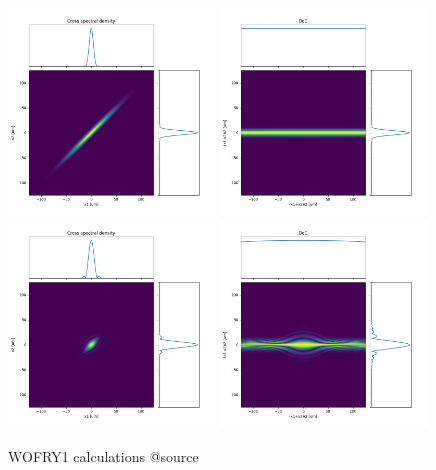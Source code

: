 \documentclass{iucr}              %
\begin{document}
\begin{figure}
    \label{fig:CSD_SRW_source}
    \includegraphics[width=0.49\textwidth]{figures/WOFRY1_CSD_source_h.png}
    \includegraphics[width=0.49\textwidth]{figures/WOFRY1_CSD2_source_h.png}
    \includegraphics[width=0.49\textwidth]{figures/WOFRY1_CSD_source_v.png}
    \includegraphics[width=0.49\textwidth]{figures/WOFRY1_CSD2_source_v.png}
    \caption{WOFRY1 calculations @source}
\end{figure}
\end{document}
